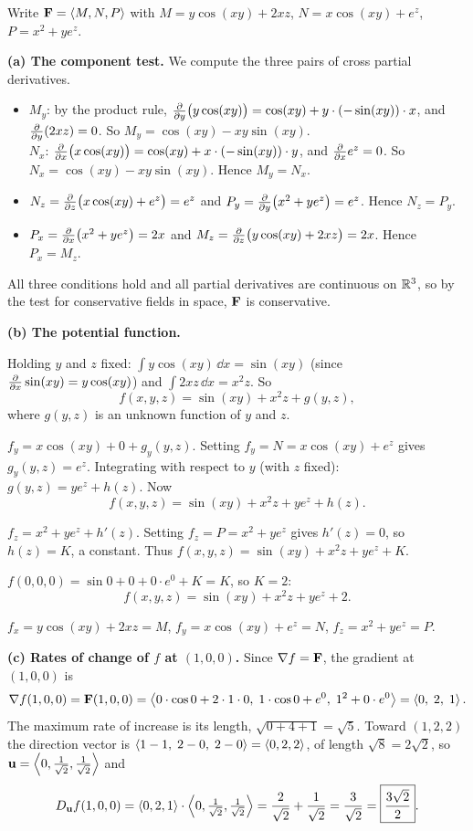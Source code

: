Write $\mathbf{F}=\left\langle M,N,P \right\rangle$ with $M=y\cos(xy)+2xz$, $N=x\cos(xy)+e^z$, $P=x^2+ye^z$.

\textbf{(a) The component test.} We compute the three pairs of cross partial derivatives.
\begin{itemize}
\item $M_y$: by the product rule, $\frac{\partial }{\partial y}\big(y\cos(xy)\big)=\cos(xy)+y\cdot(-\sin(xy))\cdot x$,
      and $\frac{\partial }{\partial y}(2xz)=0$. So $M_y=\cos(xy)-xy\sin(xy)$.\\
      $N_x$: $\frac{\partial }{\partial x}\big(x\cos(xy)\big)=\cos(xy)+x\cdot(-\sin(xy))\cdot y$, and $\frac{\partial }{\partial x}e^z=0$.
      So $N_x=\cos(xy)-xy\sin(xy)$. Hence $M_y=N_x$.
\item $N_z=\frac{\partial }{\partial z}\big(x\cos(xy)+e^z\big)=e^z$ and $P_y=\frac{\partial }{\partial y}\big(x^2+ye^z\big)=e^z$. Hence $N_z=P_y$.
\item $P_x=\frac{\partial }{\partial x}\big(x^2+ye^z\big)=2x$ and $M_z=\frac{\partial }{\partial z}\big(y\cos(xy)+2xz\big)=2x$. Hence $P_x=M_z$.
\end{itemize}
All three conditions hold and all partial derivatives are continuous on $\mathbb{R}^3$, so by
the test for conservative fields in space, $\mathbf{F}$ is conservative.

\textbf{(b) The potential function.}

 Holding $y$ and $z$ fixed:
$\int y\cos(xy)\,\dd x=\sin(xy)$ (since $\frac{\partial }{\partial x}\sin(xy)=y\cos(xy)$) and $\int2xz\,\dd x=x^2z$. So
\[
  f(x,y,z)=\sin(xy)+x^2z+g(y,z),
\]
where $g(y,z)$ is an unknown function of $y$ and $z$.

$f_y=x\cos(xy)+0+g_y(y,z)$. Setting $f_y=N=x\cos(xy)+e^z$ gives $g_y(y,z)=e^z$.
Integrating with respect to $y$ (with $z$ fixed): $g(y,z)=ye^z+h(z)$. Now
\[
  f(x,y,z)=\sin(xy)+x^2z+ye^z+h(z).
\]

$f_z=x^2+ye^z+h'(z)$. Setting $f_z=P=x^2+ye^z$ gives $h'(z)=0$, so $h(z)=K$, a constant.
Thus $f(x,y,z)=\sin(xy)+x^2z+ye^z+K$.

 $f(0,0,0)=\sin0+0+0\cdot e^0+K=K$, so $K=2$:
\[
  \boxed{f(x,y,z)=\sin(xy)+x^2z+ye^z+2}.
\]

 $f_x=y\cos(xy)+2xz=M$\checkok, $f_y=x\cos(xy)+e^z=N$\checkok, $f_z=x^2+ye^z=P$\checkok.

\textbf{(c) Rates of change of $f$ at $(1,0,0)$.}
Since $\nabla f=\mathbf{F}$, the gradient at $(1,0,0)$ is
\[
  \nabla f(1,0,0)=\mathbf{F}(1,0,0)=\left\langle 0\cdot\cos0+2\cdot1\cdot0,\;1\cdot\cos0+e^0,\;1^2+0\cdot e^0 \right\rangle=\left\langle 0,\;2,\;1 \right\rangle.
\]
The maximum rate of increase is its length, $\sqrt{0+4+1}=\boxed{\sqrt5}$.
Toward $(1,2,2)$ the direction vector is $\left\langle 1-1,\;2-0,\;2-0 \right\rangle=\left\langle 0,2,2 \right\rangle$, of length
$\sqrt8=2\sqrt2$, so $\mathbf{u}=\left\langle 0,\frac{1}{\sqrt2},\frac{1}{\sqrt2} \right\rangle$ and
\[
  D_{\mathbf{u}} f(1,0,0)=\left\langle 0,2,1 \right\rangle\cdot\left\langle 0,\tfrac{1}{\sqrt2},\tfrac{1}{\sqrt2} \right\rangle=\frac{2}{\sqrt2}+\frac{1}{\sqrt2}=\frac{3}{\sqrt2}=\boxed{\frac{3\sqrt2}{2}}.
\]

